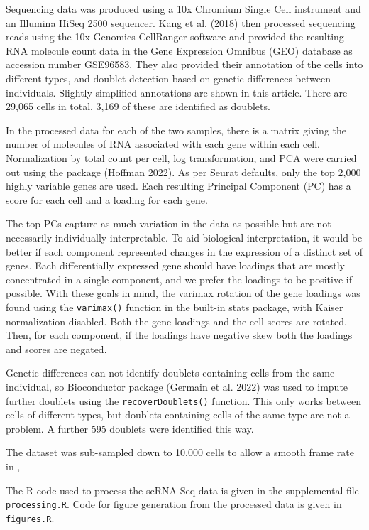 Sequencing data was produced using a 10x Chromium Single Cell instrument and an Illumina HiSeq 2500 sequencer. Kang et al. (2018) then processed sequencing reads using the 10x Genomics CellRanger software and provided the resulting RNA molecule count data in the Gene Expression Omnibus (GEO) database as accession number GSE96583. They also provided their annotation of the cells into different types, and doublet detection based on genetic differences between individuals. Slightly simplified annotations are shown in this article. There are 29,065 cells in total. 3,169 of these are identified as doublets.

In the processed data for each of the two samples, there is a matrix giving the number of molecules of RNA associated with each gene within each cell. Normalization by total count per cell, log transformation, and PCA were carried out using the  package (Hoffman 2022). As per Seurat defaults, only the top 2,000 highly variable genes are used. Each resulting Principal Component (PC) has a score for each cell and a loading for each gene.

The top PCs capture as much variation in the data as possible but are not necessarily individually interpretable. To aid biological interpretation, it would be better if each component represented changes in the expression of a distinct set of genes. Each differentially expressed gene should have loadings that are mostly concentrated in a single component, and we prefer the loadings to be positive if possible. With these goals in mind, the varimax rotation of the gene loadings was found using the \texttt{varimax()} function in the built-in stats package, with Kaiser normalization disabled. Both the gene loadings and the cell scores are rotated. Then, for each component, if the loadings have negative skew both the loadings and scores are negated.

Genetic differences can not identify doublets containing cells from the same individual, so Bioconductor package  (Germain et al. 2022) was used to impute further doublets using the \texttt{recoverDoublets()} function. This only works between cells of different types, but doublets containing cells of the same type are not a problem. A further 595 doublets were identified this way.

The dataset was sub-sampled down to 10,000 cells to allow a smooth frame rate in ,

The R code used to process the scRNA-Seq data is given in the supplemental file \texttt{processing.R}. Code for figure generation from the processed data is given in \texttt{figures.R}.

